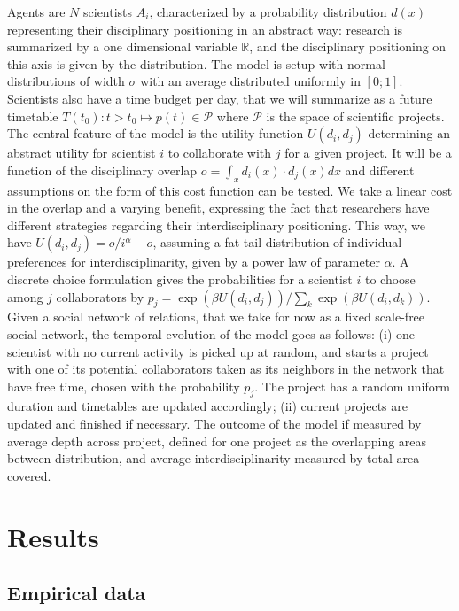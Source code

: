 \documentclass[utf8,11pt]{article}
\begin{document}
Agents are $N$ scientists $A_i$, characterized by a probability distribution $d(x)$ representing their disciplinary positioning in an abstract way: research is summarized by a one dimensional variable $\mathbb{R}$, and the disciplinary positioning on this axis is given by the distribution. The model is setup with normal distributions of width $\sigma$ with an average distributed uniformly in $\left[0;1\right]$. Scientists also have a time budget per day, that we will summarize as a future timetable $T(t_0):t>t_0 \mapsto p(t) \in \mathcal{P}$ where $\mathcal{P}$ is the space of scientific projects. The central feature of the model is the utility function $U(d_i,d_j)$ determining an abstract utility for scientist $i$ to collaborate with $j$ for a given project. It will be a function of the disciplinary overlap $o = \int_x d_i(x)\cdot d_j(x) dx$ and different assumptions on the form of this cost function can be tested. We take a linear cost in the overlap and a varying benefit, expressing the fact that researchers have different strategies regarding their interdisciplinary positioning. This way, we have $U(d_i,d_j) = o / i^\alpha - o$, assuming a fat-tail distribution of individual preferences for interdisciplinarity, given by a power law of parameter $\alpha$. A discrete choice formulation gives the probabilities for a scientist $i$ to choose among $j$ collaborators by $p_j = \exp\left(\beta U(d_i,d_j) \right)/\sum_k \exp\left(\beta U(d_i,d_k) \right)$. Given a social network of relations, that we take for now as a fixed scale-free social network, the temporal evolution of the model goes as follows: (i) one scientist with no current activity is picked up at random, and starts a project with one of its potential collaborators taken as its neighbors in the network that have free time, chosen with the probability $p_j$. The project has a random uniform duration and timetables are updated accordingly; (ii) current projects are updated and finished if necessary. The outcome of the model if measured by average depth across project, defined for one project as the overlapping areas between distribution, and average interdisciplinarity measured by total area covered.


\section{Results}

\subsection{Empirical data}
\end{document}

